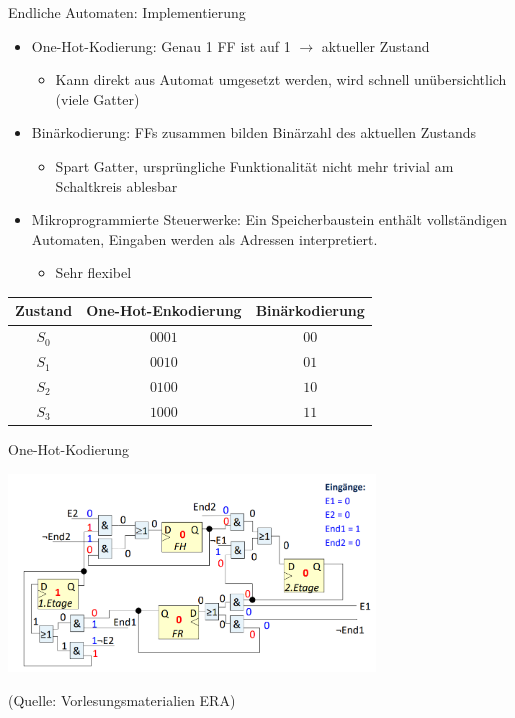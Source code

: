\documentclass[
  german,            %
  aspectratio=169,    %
]{tumbeamer}
\begin{document}
\begin{frame}[fragile, c]{Endliche Automaten: Implementierung}{}
	\begin{itemize}
		\item One-Hot-Kodierung: Genau 1 FF ist auf 1 $\rightarrow$ aktueller Zustand
      \begin{itemize}
        \item Kann direkt aus Automat umgesetzt werden, wird schnell unübersichtlich (viele Gatter)
      \end{itemize}
		\item Binärkodierung: FFs zusammen bilden Binärzahl des aktuellen Zustands
      \begin{itemize}
        \item Spart Gatter, ursprüngliche Funktionalität nicht mehr trivial am Schaltkreis ablesbar
      \end{itemize}
		\item Mikroprogrammierte Steuerwerke: Ein Speicherbaustein enthält vollständigen Automaten, Eingaben werden als Adressen interpretiert.
      \begin{itemize}
        \item Sehr flexibel
      \end{itemize}
  \end{itemize}
	\begin{table}[]
		\begin{tabular}{c|c|c}
			Zustand & One-Hot-Enkodierung & Binärkodierung \\ \hline
			$S_0$   & $0001$              & $00$             \\
			$S_1$   & $0010$              & $01$             \\
			$S_2$   & $0100$              & $10$             \\
			$S_3$   & $1000$              & $11$
		\end{tabular}
	\end{table}
\end{frame}

\begin{frame}[c]{One-Hot-Kodierung}{}
	\begin{center}
		\includegraphics[width=0.73\textwidth]{w09_onehot_lv.png}
	\end{center}
	\centering
	\tiny (Quelle: Vorlesungsmaterialien ERA)
\end{frame}
\end{document}
